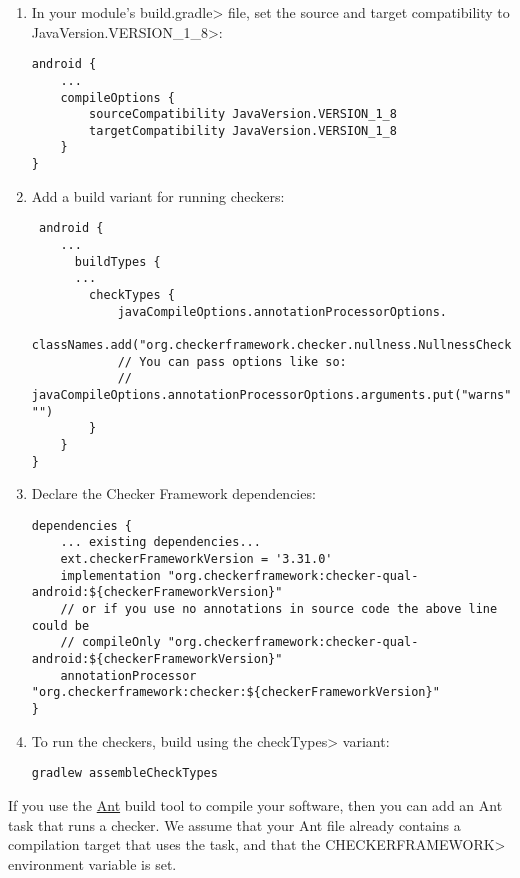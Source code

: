 \begin{enumerate}

\item In your module's \<build.gradle> file, set the source and target
  compatibility to \<JavaVersion.VERSION\_1\_8>:

\begin{Verbatim}
android {
    ...
    compileOptions {
        sourceCompatibility JavaVersion.VERSION_1_8
        targetCompatibility JavaVersion.VERSION_1_8
    }
}
\end{Verbatim}

\item Add a build variant for running checkers:

 \begin{Verbatim}
 android {
    ...
      buildTypes {
      ...
        checkTypes {
            javaCompileOptions.annotationProcessorOptions.
                    classNames.add("org.checkerframework.checker.nullness.NullnessChecker")
            // You can pass options like so:
            // javaCompileOptions.annotationProcessorOptions.arguments.put("warns", "")
        }
    }
}
\end{Verbatim}

\item Declare the Checker Framework dependencies:

\begin{mysmall}
\begin{Verbatim}
dependencies {
    ... existing dependencies...
    ext.checkerFrameworkVersion = '3.31.0'
    implementation "org.checkerframework:checker-qual-android:${checkerFrameworkVersion}"
    // or if you use no annotations in source code the above line could be
    // compileOnly "org.checkerframework:checker-qual-android:${checkerFrameworkVersion}"
    annotationProcessor "org.checkerframework:checker:${checkerFrameworkVersion}"
}
\end{Verbatim}
\end{mysmall}

\item To run the checkers, build using the \<checkTypes> variant:
\begin{Verbatim}
gradlew assembleCheckTypes
\end{Verbatim}

\end{enumerate}



If you use the \href{https://ant.apache.org/}{Ant} build tool to compile
your software, then you can add an Ant task that runs a checker.  We assume
that your Ant file already contains a compilation target that uses the
 task, and that the \<CHECKERFRAMEWORK> environment variable is set.

